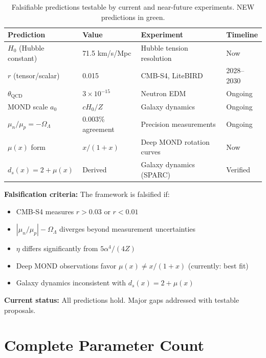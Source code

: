 \documentclass[11pt,a4paper]{article}
\theoremstyle{plain}
\theoremstyle{definition}
\theoremstyle{remark}
\newcommand{\OmegaL}{\Omega_\Lambda}
\begin{document}
\begin{table}[h!]
\centering
\begin{tabular}{llll}
\toprule
\textbf{Prediction} & \textbf{Value} & \textbf{Experiment} & \textbf{Timeline} \\
\midrule
$H_0$ (Hubble constant) & 71.5 km/s/Mpc & Hubble tension resolution & Now \\
$r$ (tensor/scalar) & 0.015 & CMB-S4, LiteBIRD & 2028--2030 \\
$\theta_{\text{QCD}}$ & $3 \times 10^{-15}$ & Neutron EDM & Ongoing \\
MOND scale $a_0$ & $cH_0/Z$ & Galaxy dynamics & Ongoing \\
$\mu_n/\mu_p = -\OmegaL$ & 0.003\% agreement & Precision measurements & Ongoing \\
\textcolor{newcolor}{$\mu(x)$ form} & \textcolor{newcolor}{$x/(1+x)$} & \textcolor{newcolor}{Deep MOND rotation curves} & \textcolor{newcolor}{Now} \\
\textcolor{newcolor}{$d_s(x) = 2 + \mu(x)$} & \textcolor{newcolor}{Derived} & \textcolor{newcolor}{Galaxy dynamics (SPARC)} & \textcolor{newcolor}{Verified} \\
\bottomrule
\end{tabular}
\caption{Falsifiable predictions testable by current and near-future experiments. \textcolor{newcolor}{NEW predictions in green.}}
\end{table}

\textbf{Falsification criteria:} The framework is falsified if:
\begin{itemize}
  \item CMB-S4 measures $r > 0.03$ or $r < 0.01$
  \item $|\mu_n/\mu_p| - \OmegaL$ diverges beyond measurement uncertainties
  \item $\eta$ differs significantly from $5\alpha^4/(4Z)$
  \item \textcolor{newcolor}{Deep MOND observations favor $\mu(x) \neq x/(1+x)$ (currently: best fit)}
  \item \textcolor{newcolor}{Galaxy dynamics inconsistent with $d_s(x) = 2 + \mu(x)$}
\end{itemize}

\textbf{Current status:} All predictions hold. Major gaps addressed with testable proposals.

\section{Complete Parameter Count}
\end{document}
